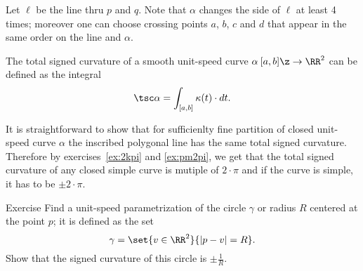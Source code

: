 Let $\ell$ be the line thru $p$ and $q$.
Note that $\alpha$ changes the side of $\ell$ at least 4 times;
moreover one can choose crossing points $a$, $b$, $c$ and $d$ that appear in the same order on the line and $\alpha$.













The total signed curvature of a smooth unit-speed curve $\alpha\:[a,b]\z\to\RR^2$ can be defined as the integral
\[\tsc\alpha=\int_{[a,b]}\kappa(t)\cdot dt.\]

It is straightforward to show that for sufficienlty fine partition of closed unit-speed curve $\alpha$ the inscribed polygonal line has the same total signed curvature.
Therefore by exercises~\ref{ex:2kpi} and \ref{ex:pm2pi},
we get that the total signed curvature of any closed simple curve is mutiple of $2\cdot\pi$ and if the curve is simple, it has to be $\pm2\cdot\pi$.

\begin{thm}{Exercise}\label{ex:curvature-of-circle}
Find a unit-speed parametrization of the circle $\gamma$ or radius $R$ centered at the point $p$;
it is defined as the set 
\[\gamma=\set{v\in\RR^2}{|p-v|=R}.\]
Show that the signed curvature of this circle is $\pm \tfrac1R$.
\end{thm}
